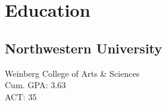 
\section{Education}

\subsection{Northwestern University}
Weinberg College of Arts \& Sciences
\\ Cum. GPA: 3.63
\\ ACT: 35
\sectionsep
